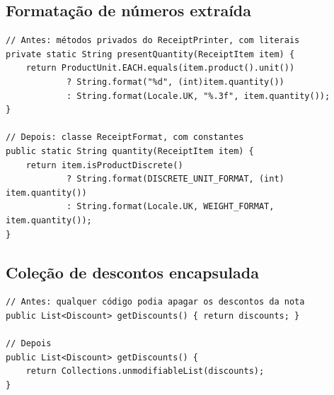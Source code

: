 \subsection{Formata\c{c}\~ao de n\'umeros extra\'ida}
\begin{lstlisting}
// Antes: métodos privados do ReceiptPrinter, com literais
private static String presentQuantity(ReceiptItem item) {
    return ProductUnit.EACH.equals(item.product().unit())
            ? String.format("%d", (int)item.quantity())
            : String.format(Locale.UK, "%.3f", item.quantity());
}

// Depois: classe ReceiptFormat, com constantes
public static String quantity(ReceiptItem item) {
    return item.isProductDiscrete()
            ? String.format(DISCRETE_UNIT_FORMAT, (int) item.quantity())
            : String.format(Locale.UK, WEIGHT_FORMAT, item.quantity());
}
\end{lstlisting}

\subsection{Cole\c{c}\~ao de descontos encapsulada}
\begin{lstlisting}
// Antes: qualquer código podia apagar os descontos da nota
public List<Discount> getDiscounts() { return discounts; }

// Depois
public List<Discount> getDiscounts() {
    return Collections.unmodifiableList(discounts);
}
\end{lstlisting}

